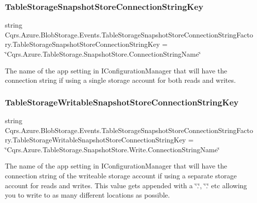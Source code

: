 \subsubsection{\texorpdfstring{Table\+Storage\+Snapshot\+Store\+Connection\+String\+Key}{TableStorageSnapshotStoreConnectionStringKey}}
{\footnotesize\ttfamily string Cqrs.\+Azure.\+Blob\+Storage.\+Events.\+Table\+Storage\+Snapshot\+Store\+Connection\+String\+Factory.\+Table\+Storage\+Snapshot\+Store\+Connection\+String\+Key = \char`\"{}Cqrs.\+Azure.\+Table\+Storage.\+Snapshot\+Store.\+Connection\+String\+Name\char`\"{}\hspace{0.3cm}{\ttfamily [static]}}



The name of the app setting in I\+Configuration\+Manager that will have the connection string if using a single storage account for both reads and writes. 

\mbox{\label{classCqrs_1_1Azure_1_1BlobStorage_1_1Events_1_1TableStorageSnapshotStoreConnectionStringFactory_a7bb0a4b42242b523df90611e8c28a4e6_a7bb0a4b42242b523df90611e8c28a4e6}} 
\subsubsection{\texorpdfstring{Table\+Storage\+Writable\+Snapshot\+Store\+Connection\+String\+Key}{TableStorageWritableSnapshotStoreConnectionStringKey}}
{\footnotesize\ttfamily string Cqrs.\+Azure.\+Blob\+Storage.\+Events.\+Table\+Storage\+Snapshot\+Store\+Connection\+String\+Factory.\+Table\+Storage\+Writable\+Snapshot\+Store\+Connection\+String\+Key = \char`\"{}Cqrs.\+Azure.\+Table\+Storage.\+Snapshot\+Store.\+Write.\+Connection\+String\+Name\char`\"{}\hspace{0.3cm}{\ttfamily [static]}}



The name of the app setting in I\+Configuration\+Manager that will have the connection string of the writeable storage account if using a separate storage account for reads and writes. This value gets appended with a \char`\"{}.\char`\"{}, \char`\"{}.\char`\"{} etc allowing you to write to as many different locations as possible. 


